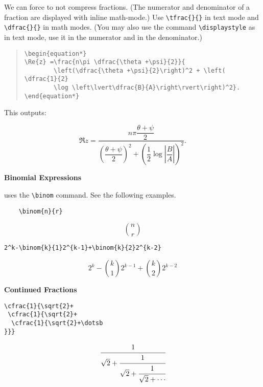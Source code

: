 \documentclass[letterpaper,twoside,10pt]{article}
\begin{document}
We can force {\LaTeXe} to not compress fractions. (The numerator and denominator of a fraction are
displayed with inline math-mode.) Use \verb!\tfrac{}{}! in text mode and \verb!\dfrac{}{}! in math
modes. (You may also use the command \verb!\displaystyle! as in text mode, use it in the numerator
and in the denominator.)

\begin{quote}
 \small{\begin{verbatim}
\begin{equation*}
\Re{z} =\frac{n\pi \dfrac{\theta +\psi}{2}}{
        \left(\dfrac{\theta +\psi}{2}\right)^2 + \left( \dfrac{1}{2}
        \log \left\lvert\dfrac{B}{A}\right\rvert\right)^2}.
\end{equation*}
        \end{verbatim}
}
\end{quote}

This outputs:

\begin{equation*}
\Re{z} =\frac{n\pi \dfrac{\theta +\psi}{2}}{
        \left(\dfrac{\theta +\psi}{2}\right)^2 + \left( \dfrac{1}{2}
        \log \left\lvert\dfrac{B}{A}\right\rvert\right)^2}.
\end{equation*}


\bigbreak\textbf{Binomial Expressions}

{\LaTeXe} uses the \verb!\binom! command. See the following examples.

\begin{multicols}{2}
\small{\begin{verbatim}
	\binom{n}{r}
\end{verbatim}
}
\[
\binom{n}{r}
\]

\end{multicols}



\begin{multicols}{2}
\small{\begin{verbatim}
2^k-\binom{k}{1}2^{k-1}+\binom{k}{2}2^{k-2}
\end{verbatim}}
\[
2^k-\binom{k}{1}2^{k-1}+\binom{k}{2}2^{k-2}
\]
\end{multicols}

\newpage
\textbf{Continued Fractions}

\begin{multicols}{2}
\small{\begin{verbatim}
\cfrac{1}{\sqrt{2}+
 \cfrac{1}{\sqrt{2}+
  \cfrac{1}{\sqrt{2}+\dotsb
}}}
\end{verbatim}}
\[
\cfrac{1}{\sqrt{2}+
 \cfrac{1}{\sqrt{2}+
  \cfrac{1}{\sqrt{2}+\dotsb
}}}
\]
\end{multicols}
\end{document}
